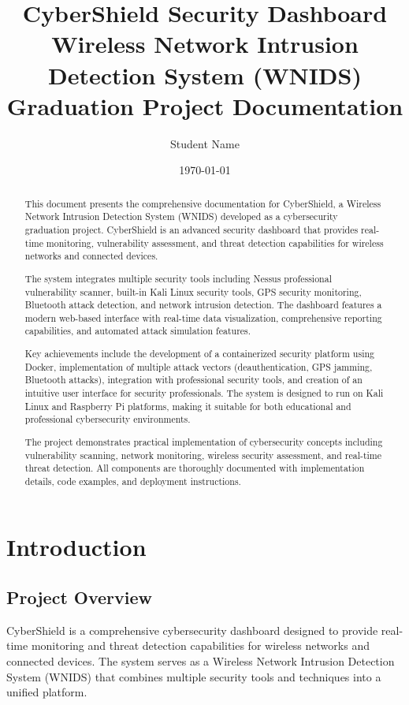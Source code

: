 \documentclass[12pt,a4paper]{report}
\title{\textbf{CyberShield Security Dashboard}\\
       \large{Wireless Network Intrusion Detection System (WNIDS)}\\
       \large{Graduation Project Documentation}}
\author{Student Name}
\date{\today}
\begin{document}
\maketitle

\tableofcontents
\listoffigures
\listoftables

\begin{abstract}
This document presents the comprehensive documentation for CyberShield, a Wireless Network Intrusion Detection System (WNIDS) developed as a cybersecurity graduation project. CyberShield is an advanced security dashboard that provides real-time monitoring, vulnerability assessment, and threat detection capabilities for wireless networks and connected devices.

The system integrates multiple security tools including Nessus professional vulnerability scanner, built-in Kali Linux security tools, GPS security monitoring, Bluetooth attack detection, and network intrusion detection. The dashboard features a modern web-based interface with real-time data visualization, comprehensive reporting capabilities, and automated attack simulation features.

Key achievements include the development of a containerized security platform using Docker, implementation of multiple attack vectors (deauthentication, GPS jamming, Bluetooth attacks), integration with professional security tools, and creation of an intuitive user interface for security professionals. The system is designed to run on Kali Linux and Raspberry Pi platforms, making it suitable for both educational and professional cybersecurity environments.

The project demonstrates practical implementation of cybersecurity concepts including vulnerability scanning, network monitoring, wireless security assessment, and real-time threat detection. All components are thoroughly documented with implementation details, code examples, and deployment instructions.
\end{abstract}

\chapter{Introduction}

\section{Project Overview}

CyberShield is a comprehensive cybersecurity dashboard designed to provide real-time monitoring and threat detection capabilities for wireless networks and connected devices. The system serves as a Wireless Network Intrusion Detection System (WNIDS) that combines multiple security tools and techniques into a unified platform.
\end{document}
